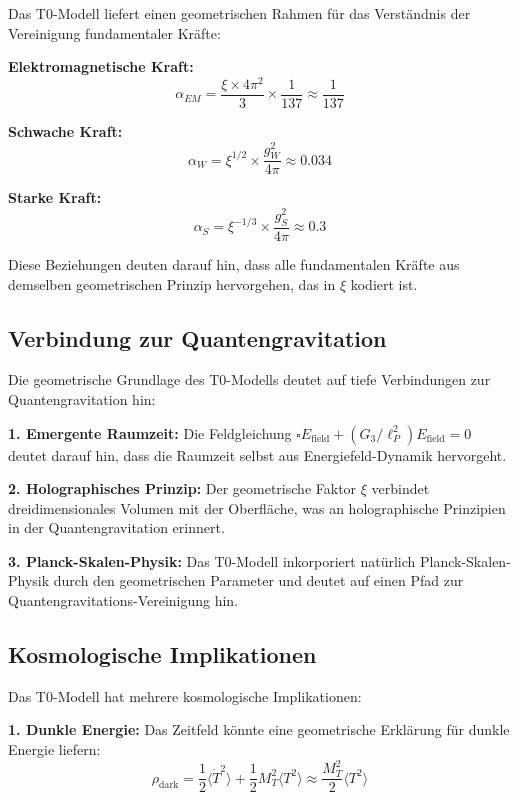 \documentclass[12pt,a4paper]{article}
\newcommand{\xigeom}{\xi}
\begin{document}
Das T0-Modell liefert einen geometrischen Rahmen für das Verständnis der Vereinigung fundamentaler Kräfte:

\textbf{Elektromagnetische Kraft:}
\begin{equation}
\alpha_{EM} = \frac{\xigeom \times 4\pi^2}{3} \times \frac{1}{137} \approx \frac{1}{137}
\end{equation}

\textbf{Schwache Kraft:}
\begin{equation}
\alpha_W = \xigeom^{1/2} \times \frac{g_W^2}{4\pi} \approx 0.034
\end{equation}

\textbf{Starke Kraft:}
\begin{equation}
\alpha_S = \xigeom^{-1/3} \times \frac{g_S^2}{4\pi} \approx 0.3
\end{equation}

Diese Beziehungen deuten darauf hin, dass alle fundamentalen Kräfte aus demselben geometrischen Prinzip hervorgehen, das in $\xigeom$ kodiert ist.

\subsection{Verbindung zur Quantengravitation}

Die geometrische Grundlage des T0-Modells deutet auf tiefe Verbindungen zur Quantengravitation hin:

\textbf{1. Emergente Raumzeit:}
Die Feldgleichung $\square E_{\text{field}} + (G_3/\ell_P^2) E_{\text{field}} = 0$ deutet darauf hin, dass die Raumzeit selbst aus Energiefeld-Dynamik hervorgeht.

\textbf{2. Holographisches Prinzip:}
Der geometrische Faktor $\xigeom$ verbindet dreidimensionales Volumen mit der Oberfläche, was an holographische Prinzipien in der Quantengravitation erinnert.

\textbf{3. Planck-Skalen-Physik:}
Das T0-Modell inkorporiert natürlich Planck-Skalen-Physik durch den geometrischen Parameter und deutet auf einen Pfad zur Quantengravitations-Vereinigung hin.

\subsection{Kosmologische Implikationen}

Das T0-Modell hat mehrere kosmologische Implikationen:

\textbf{1. Dunkle Energie:}
Das Zeitfeld könnte eine geometrische Erklärung für dunkle Energie liefern:
\begin{equation}
\rho_{\text{dark}} = \frac{1}{2} \langle \dot{T}^2 \rangle + \frac{1}{2} M_T^2 \langle T^2 \rangle \approx \frac{M_T^2}{2} \langle T^2 \rangle
\end{equation}
\end{document}
